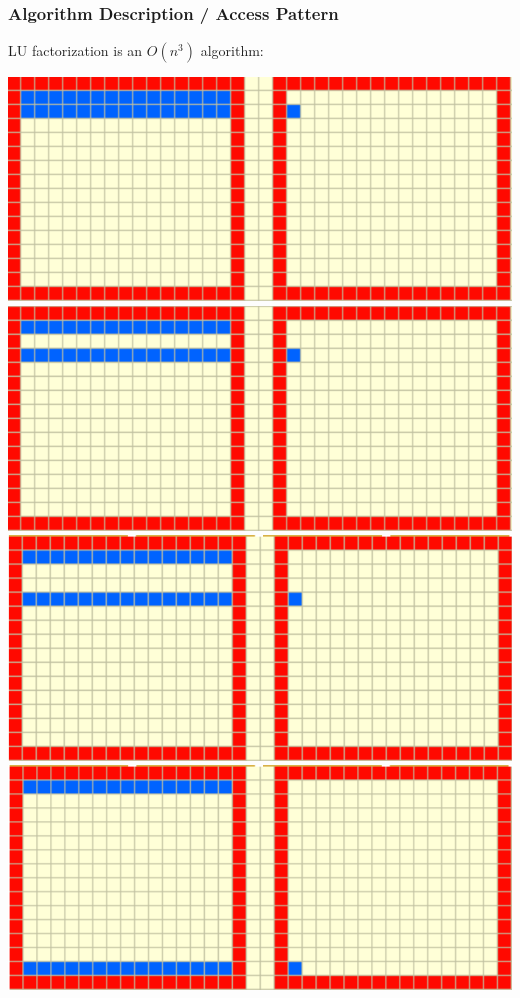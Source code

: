 \documentclass{beamer}
\begin{document}
\begin{frame}
\frametitle{Algorithm Description / Access Pattern}

LU factorization is an $ O(n^3) $ algorithm:

\begin{center}
\includegraphics[scale=0.2]{figures/lu1a}\hspace{1em}
\includegraphics[scale=0.2]{figures/lu1b}
\hspace{1em}
\includegraphics[scale=0.2]{figures/lu1c}
\hspace{1em}
\includegraphics[scale=0.2]{figures/lu2} 



\end{center}
\end{frame}
\end{document}
